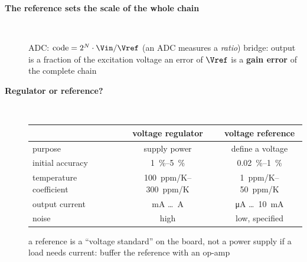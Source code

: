 \begin{description}
\item[{\rot\bf The reference sets the scale of the whole chain}]~\\[-\lblskip]
\begin{center}
\end{center}
\bi
	\ite ADC: $\mathrm{code} = 2^N\cdot \Vin/\Vref$ \quad (an ADC measures a \emph{ratio})
	\ite bridge: output is a fraction of the excitation voltage
	\ite an error of $\Vref$ is a \textbf{gain error} of the complete chain
\ei
\os{\newpage}

\item[{\rot\bf Regulator or reference?}]~\\[-\lblskip]
\begin{center}
\begin{tabular}{lcc}
\toprule
 & voltage regulator & voltage reference \\
\midrule
purpose & supply power & define a voltage \\
initial accuracy & \SIrange{1}{5}{\percent} & \SIrange{0.02}{1}{\percent} \\
temperature coefficient & \SIrange{100}{300}{ppm/K} & \SIrange{1}{50}{ppm/K} \\
output current & \si{\milli\ampere} \ldots\ \si{\ampere} & \si{\micro\ampere} \ldots\ \SI{10}{\milli\ampere} \\
noise & high & low, specified \\
\bottomrule
\end{tabular}
\end{center}
\bi
	\ite a reference is a ``voltage standard'' on the board, not a power supply
	\ite if a load needs current: buffer the reference with an op-amp
\ei
\os{\newpage}
\end{description}

